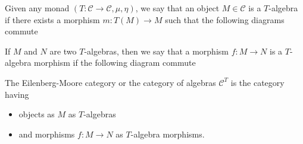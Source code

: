 \documentclass[../thesis.tex]{subfiles}
\begin{document}
        Given any monad $(T : \mathcal{C} \rightarrow \mathcal{C}, \mu, \eta)$, we say that an object $M \in \mathcal{C}$ is a $T$-algebra if there exists a morphism $m : T(M) \rightarrow M$ such that the following diagrams commute
        \begin{center}
        \end{center}

        If $M$ and $N$ are two $T$-algebras, then we say that a morphism $f : M \rightarrow N$ is a $T$-algebra morphism if the following diagram commute
        \begin{center}
        \end{center}
        \begin{definition}
            The Eilenberg-Moore category or the category of algebras $\mathcal{C}^T$ is the category having
            \begin{itemize}
                \item objects as $M$ as $T$-algebras
                \item and morphisms $f : M \rightarrow N$ as $T$-algebra morphisms.
            \end{itemize}
        \end{definition}
        
\end{document}
